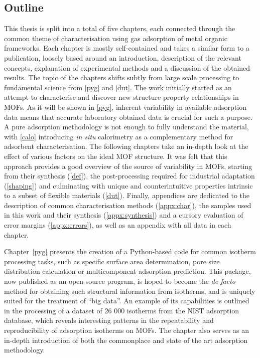\subsection*{Outline}

This thesis is split into a total of five chapters, each
connected through the common theme of characterisation 
using gas adsorption of metal organic frameworks. 
Each chapter is mostly 
self-contained and takes a similar form to a publication,
loosely based around an introduction, description of the 
relevant concepts, explanation of experimental methods and
a discussion of the obtained results. 
The topic of the chapters 
shifts subtly from large scale processing to fundamental
science from \autoref{pyg} and \autoref{dut}.
The work initially started as an attempt to characterise and
discover new structure-property relationships in \glspl{MOF}.
As it will be shown in \autoref{pyg}, inherent variability
in available adsorption data means that accurate laboratory
obtained data is crucial for such a purpose. A pure adsorption
methodology is not enough to fully understand the material,
with \autoref{calo} introducing \textit{in situ} calorimetry
as a complementary method for adsorbent characterisation.
The following chapters take an in-depth look at the effect of 
various factors on the ideal \gls{MOF} structure.
It was felt that this approach provides a good overview of the source of 
variability in \glspl{MOF}, starting from their synthesis
(\autoref{def}), the post-processing required for industrial
adaptation (\autoref{shaping}) and culminating with 
unique and counterintuitive properties intrinsic to a subset 
of flexible materials (\autoref{dut}). Finally, appendices are 
dedicated to the description of common characterisation methods
(\autoref{appx:char}), the samples used in this work and their 
synthesis (\autoref{appx:synthesis}) and a cursory evaluation of 
error margins (\autoref{appx:errors}), as well as an appendix with 
all data in each chapter.

Chapter~\ref{pyg} presents the creation of a Python-based code for
common isotherm processing tasks, such as specific surface area 
determination, pore size distribution calculation or multicomponent 
adsorption prediction. This package, now published as an 
open-source program, is hoped to become the \textit{de facto}
method for obtaining such structural information from isotherms,
and is uniquely suited for the treatment of ``big data''.
An example of its capabilities is outlined in the processing of 
a dataset of 26 000 isotherms from the \gls{NIST} adsorption database,
which reveals interesting patterns in the repeatability and reproducibility
of adsorption isotherms on \glspl{MOF}. The chapter also serves as
an in-depth introduction of both the commonplace and state of the art adsorption methodology.

